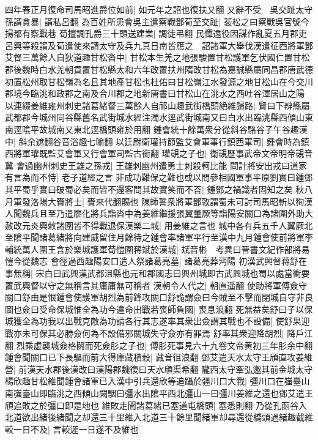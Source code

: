 四年春正月復命司馬昭進爵位如前|{
	如元年之詔也復扶又翻}
又辭不受　吳交趾太守孫諝貪暴|{
	諝私呂翻}
為百姓所患會吳主遣察戰鄧荀至交趾|{
	裴松之曰察戰吳官號今揚都有察戰巷}
荀擅調孔爵三十頭送建業|{
	調徒弔翻}
民憚遠役因謀作亂夏五月郡吏呂興等殺諝及荀遣使來請太守及兵九真日南皆應之　詔諸軍大舉伐漢遣征西將軍鄧艾督三萬餘人自狄道趣甘松沓中|{
	甘松本生羌之地張駿置甘松護軍乞伏國仁置甘松郡後魏時白水羌朝貢置甘松縣太和六年改置扶州隋改甘松為嘉誠縣屬同昌郡唐武德初置松州取甘松嶺為名且其地產甘松也杜佑曰甘松嶺江水發源之地甘松山在今交川郡境今臨洮和政郡之南及合川郡之地新唐書曰甘松山在洮水之西吐谷渾居山之陽}
以連綴姜維雍州刺史諸葛緒督三萬餘人自祁山趣武街橋頭絶維歸路|{
	賢曰下辨縣屬武都郡今城州同谷縣舊名武街城水經注濁水逕武街城南又曰白水出臨洮縣西傾山東南逕隂平故城南又東北逕橋頭雍於用翻}
鍾會統十餘萬衆分從斜谷駱谷子午谷趣漢中|{
	斜余遮翻谷音浴趣七喻翻}
以廷尉衛瓘持節監艾會軍事行鎮西軍司|{
	鍾會時為鎮西將軍瓘既監艾會軍又行會軍司監古銜翻}
瓘覬之子也|{
	衛覬歷事武帝文帝明帝覬音冀}
會過幽州刺史王雄之孫戎|{
	王雄刺幽州遣勇士刺殺軻比能}
問計將安出戎曰道家有言為而不恃|{
	老子道經之言}
非成功難保之難也或以問參相國軍事平原劉實曰鍾鄧其平蜀乎實曰破蜀必矣而皆不還客問其故實笑而不荅|{
	鍾鄧之禍識者固知之矣}
秋八月軍發洛陽大賚將士|{
	賚來代翻賜也}
陳師誓衆將軍鄧敦謂蜀未可討司馬昭斬以狥漢人聞魏兵且至乃遣廖化將兵詣沓中為姜維繼援張翼董厥等詣陽安關口為諸圍外助大赦改元炎興敕諸圍皆不得戰退保漢樂二城|{
	用姜維之言也}
城中各有兵五千人翼厥北至隂平聞諸葛緒將向建威留住月餘待之鍾會率諸軍平行至漢中九月鍾會使前將軍李輔統萬人圍王含於樂城護軍荀愷圍蒋斌於漢城|{
	斌音彬　考異曰晉書文紀作部將易愷今從魏志}
會徑過西趣陽安口遣人祭諸葛亮墓|{
	諸葛亮葬沔陽}
初漢武興督蒋舒在事無稱|{
	宋白曰武興漢武都沮縣也元和郡國志曰興州城即古武興城也蜀以處當衝要置武興督以守之無稱言其庸庸無可稱者}
漢朝令人代之|{
	朝直遥翻}
使助將軍傅僉守關口舒由是恨鍾會使護軍胡烈為前鋒攻關口舒詭謂僉曰今賊至不擊而閉城自守非良圖也僉曰受命保城惟全為功今違命出戰若喪師負國|{
	喪息浪翻}
死無益矣舒曰子以保城獲全為功我以出戰克敵為功請各行其志遂率其衆出僉謂其戰也不設備|{
	使舒果迎戰亦未可保其必勝僉何為不設備邪關城失守僉亦有罪焉}
舒率其衆迎降胡烈|{
	降戶江翻}
烈乘虚襲城僉格鬬而死僉肜之子也|{
	傅肜死事見六十九卷文帝黄初三年肜余中翻}
鍾會聞關口已下長驅而前大得庫藏積穀|{
	藏音徂浪翻}
鄧艾遣天水太守王頎直攻姜維營|{
	前漢天水郡後漢改曰漢陽郡魏復曰天水頎渠希翻}
隴西太守牽弘邀其前金城太守楊欣趣甘松維聞鍾會諸軍已入漢中引兵還欣等追躡於疆川口大戰|{
	彊川口在嵹臺山南嵹臺山即臨洮之西傾山闕駰曰彊水出隂平西北彊山一曰彊川姜維之還也鄧艾遣王頎追敗之於彊口即是地也}
維敗走聞諸葛緒已塞道屯橋頭|{
	塞悉則翻}
乃從孔函谷入北道欲出緒後緒聞之却還三十里維入北道三十餘里聞緒軍却尋還從橋頭過緒趣截維較一日不及|{
	言較遲一日遂不及維也}
